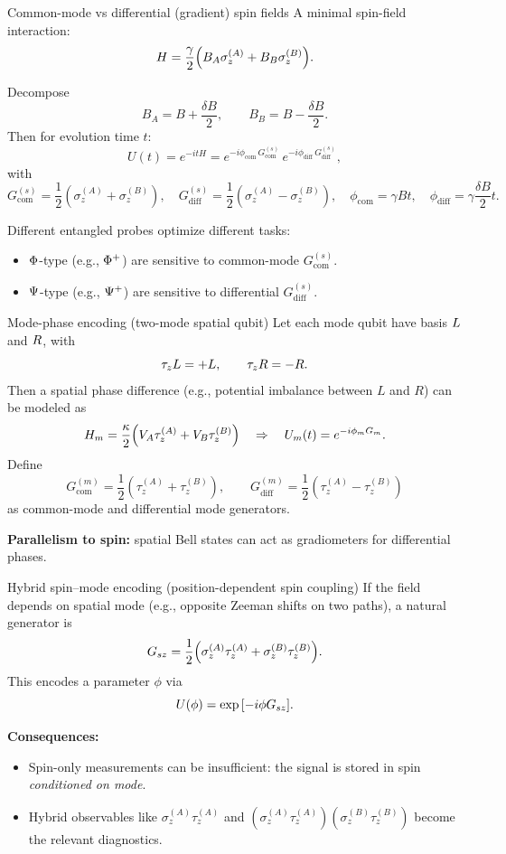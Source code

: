 \documentclass[aspectratio=169]{beamer}
\newcommand{\sA}[1]{\sigma_{#1}^{(A)}}
\newcommand{\sB}[1]{\sigma_{#1}^{(B)}}
\newcommand{\tA}[1]{\tau_{#1}^{(A)}}
\newcommand{\tB}[1]{\tau_{#1}^{(B)}}
\newcommand{\GcomS}{G_{\mathrm{com}}^{(s)}}
\newcommand{\GdiffS}{G_{\mathrm{diff}}^{(s)}}
\newcommand{\GcomM}{G_{\mathrm{com}}^{(m)}}
\newcommand{\GdiffM}{G_{\mathrm{diff}}^{(m)}}
\begin{document}
\begin{frame}{Common-mode vs differential (gradient) spin fields}
\small
A minimal spin-field interaction:
\[
H = \frac{\gamma}{2}\qty(B_A \sA{z} + B_B \sB{z}).
\]

Decompose
\[
B_A = B + \frac{\delta B}{2},
\qquad
B_B = B - \frac{\delta B}{2}.
\]
Then for evolution time $t$:
\[
U(t)=e^{-itH}
=
e^{-i\phi_{\mathrm{com}}\,\GcomS}\,
e^{-i\phi_{\mathrm{diff}}\,\GdiffS},
\]
with
\[
\GcomS=\frac{1}{2}(\sA{z}+\sB{z}),\quad
\GdiffS=\frac{1}{2}(\sA{z}-\sB{z}),
\quad
\phi_{\mathrm{com}}=\gamma B t,\quad
\phi_{\mathrm{diff}}=\gamma \frac{\delta B}{2}t.
\]

\vspace{0.35em}
Different entangled probes optimize different tasks:
\begin{itemize}
\item $\relax{\Phi}$-type (e.g., $\relax{\Phi^+}$) are sensitive to common-mode $\GcomS$.
\item $\relax{\Psi}$-type (e.g., $\relax{\Psi^+}$) are sensitive to differential $\GdiffS$.
\end{itemize}
\end{frame}

\begin{frame}{Mode-phase encoding (two-mode spatial qubit)}
\small
Let each mode qubit have basis $\relax{L}$ and $\relax{R}$, with
\[
\tau_z\relax{L}=+\relax{L},\qquad \tau_z\relax{R}=-\relax{R}.
\]
Then a spatial phase difference (e.g., potential imbalance between $L$ and $R$) can be modeled as
\[
H_m=\frac{\kappa}{2}\qty(V_A \tA{z}+V_B \tB{z})
\quad\Rightarrow\quad
U_m(t)=e^{-i\phi_m G_m}.
\]
Define
\[
\GcomM=\frac{1}{2}(\tA{z}+\tB{z}),\qquad
\GdiffM=\frac{1}{2}(\tA{z}-\tB{z})
\]
as common-mode and differential mode generators.

\vspace{0.35em}
\textbf{Parallelism to spin:} spatial Bell states can act as gradiometers for differential phases.
\end{frame}

\begin{frame}{Hybrid spin--mode encoding (position-dependent spin coupling)}
\small
If the field depends on spatial mode (e.g., opposite Zeeman shifts on two paths), a natural generator is
\[
G_{sz}
=
\frac{1}{2}\qty(\sA{z}\tA{z}+\sB{z}\tB{z}).
\]
This encodes a parameter $\phi$ via
\[
U(\phi)=\exp\qty[-i\phi G_{sz}].
\]

\vspace{0.35em}
\textbf{Consequences:}
\begin{itemize}
\item Spin-only measurements can be insufficient: the signal is stored in spin \emph{conditioned on mode}.
\item Hybrid observables like $\sA{z}\tA{z}$ and
$(\sA{z}\tA{z})(\sB{z}\tB{z})$
become the relevant diagnostics.
\end{itemize}
\end{frame}
\end{document}
